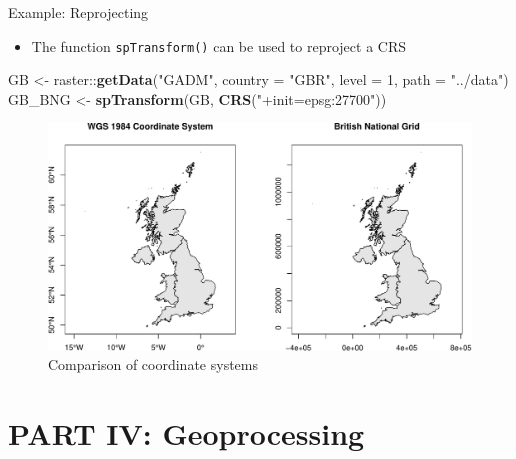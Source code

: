 \documentclass[10pt,ignorenonframetext,]{beamer}
\newenvironment{Shaded}{\begin{snugshade}}{\end{snugshade}}
\newcommand{\KeywordTok}[1]{\textcolor[rgb]{0.13,0.29,0.53}{\textbf{{#1}}}}
\newcommand{\DataTypeTok}[1]{\textcolor[rgb]{0.13,0.29,0.53}{{#1}}}
\newcommand{\DecValTok}[1]{\textcolor[rgb]{0.00,0.00,0.81}{{#1}}}
\newcommand{\StringTok}[1]{\textcolor[rgb]{0.31,0.60,0.02}{{#1}}}
\newcommand{\NormalTok}[1]{{#1}}
\providecommand{\tightlist}{%
  \setlength{\itemsep}{0pt}\setlength{\parskip}{0pt}}
\begin{document}
\begin{frame}[fragile]{Example: Reprojecting}

\begin{itemize}
\tightlist
\item
  The function \texttt{spTransform()} can be used to reproject a CRS
\end{itemize}

\begin{Shaded}
\begin{Highlighting}[]
\NormalTok{GB <-}\StringTok{ }\NormalTok{raster::}\KeywordTok{getData}\NormalTok{(}\StringTok{"GADM"}\NormalTok{, }\DataTypeTok{country =} \StringTok{"GBR"}\NormalTok{, }\DataTypeTok{level =} \DecValTok{1}\NormalTok{, }
    \DataTypeTok{path =} \StringTok{"../data"}\NormalTok{)}
\NormalTok{GB_BNG <-}\StringTok{ }\KeywordTok{spTransform}\NormalTok{(GB, }\KeywordTok{CRS}\NormalTok{(}\StringTok{"+init=epsg:27700"}\NormalTok{))}
\end{Highlighting}
\end{Shaded}

\begin{figure}

{\centering \includegraphics[width=0.8\linewidth]{SpatialDataLecture_files/figure-beamer/unnamed-chunk-32-1} 

}

\caption{Comparison of coordinate systems}\label{fig:unnamed-chunk-32}
\end{figure}

\end{frame}

\section{PART IV: Geoprocessing}\label{part-iv-geoprocessing}
\end{document}
